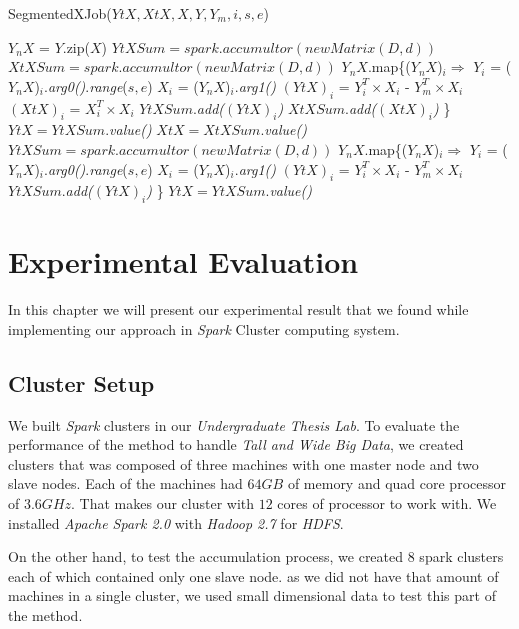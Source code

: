 \documentclass[12pt,notitlepage,oneside]{report}
\newcommand\tab[1][.5cm]{\hspace*{#1}}
\begin{document}
\begin{algorithm} [!htbp]
  \caption{SegmentedXJob($YtX,XtX,X,Y,Y_m,i,s,e$)}
  \begin{algorithmic} [1]
\label{segmented2}
	\STATE $Y_nX$ = $Y$.zip($X$)
	 		\STATE $YtXSum = spark.accumultor(newMatrix(D,d))$
			\STATE $XtXSum = spark.accumultor(newMatrix(D,d))$
	 		\STATE $Y_nX$.map\{($Y_nX$)$_i \Rightarrow$
	 		\STATE \tab $Y_i$ = ($Y_nX$)$_i$.\textit{arg0()}.\textit{range}($s,e$)
			\STATE \tab $X_i$ = ($Y_nX$)$_i$.\textit{arg1()}
			\STATE \tab $(YtX)_i$ = $Y_i^T \times  X_i$ - $Y_m^T \times X_i$   
			\STATE \tab $(XtX)_i$ = $X_i^T \times  X_i$
			 \STATE \tab $YtXSum$.\textit{add($(YtX)_i$)}
			 \STATE \tab $XtXSum$.\textit{add($(XtX)_i$)}
			\STATE \}
		\STATE $YtX = YtXSum$.\textit{value()}
		\STATE $XtX = XtXSum$.\textit{value()}
	\ELSE
			\STATE $YtXSum = spark.accumultor(newMatrix(D,d))$
	 		\STATE $Y_nX$.map\{($Y_nX$)$_i \Rightarrow$
			\STATE \tab $Y_i$ = ($Y_nX$)$_i$.\textit{arg0()}.\textit{range}($s,e$)
			\STATE \tab $X_i$ = ($Y_nX$)$_i$.\textit{arg1()}
			\STATE \tab $(YtX)_i$ = $Y_i^T \times  X_i$ - $Y_m^T \times X_i$   
			 \STATE \tab $YtXSum$.\textit{add($(YtX)_i$)}
			\STATE \}
		\STATE $YtX = YtXSum$.\textit{value()}
	 \ENDIF
  \end{algorithmic}
\end{algorithm}

\chapter{Experimental Evaluation}
	\label{c:9}
In this chapter we will present our experimental result that we found while implementing our approach in \textit{Spark} Cluster computing system.
\section{Cluster Setup}
We built \textit{Spark} clusters in our \textit{Undergraduate Thesis Lab}. To evaluate the performance of the method to handle \textit{Tall and Wide Big Data}, we created clusters that was composed of three machines with one master node and two slave nodes. Each of the machines had $64GB$ of memory and quad core processor of $3.6GHz$. That makes our cluster with $12$ cores of processor to work with. We installed \textit{Apache Spark 2.0} with \textit{\textit{Hadoop} 2.7} for \textit{HDFS}.

On the other hand, to test the accumulation process, we created 8 spark clusters each of which contained only one slave node. as we did not have that amount of machines in a single cluster, we used small dimensional data to test this part of the method.
\end{document}
